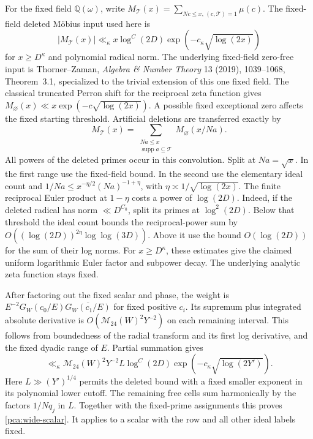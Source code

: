 For the fixed field \(\mathbb Q(\omega)\), write
\(M_{\mathcal T}(x)=\sum_{Nc\le x,\,(c,\mathcal T)=1}\mu(c)\).
The fixed-field deleted M\"obius input used here is
\[
 |M_{\mathcal T}(x)|\ll_\kappa
 x\log^C(2D)\exp(-c_\kappa\sqrt{\log(2x)})
\]
for \(x\ge D^\kappa\) and polynomial radical norm.
The underlying fixed-field zero-free input is
Thorner--Zaman, \emph{Algebra \& Number Theory} 13 (2019),
1039--1068, Theorem~3.1, specialized to the trivial
extension of this one fixed field.
The classical truncated Perron shift for the reciprocal
zeta function gives
\(M_{\varnothing}(x)\ll x\exp(-c\sqrt{\log(2x)})\).
A possible fixed exceptional zero affects the fixed
starting threshold.
Artificial deletions are transferred exactly by
\[
 M_{\mathcal T}(x)
   =\sum_{\substack{Na\le x\\
                   \operatorname{supp}a\subseteq\mathcal T}}
                              M_{\varnothing}(x/Na).
\]
All powers of the deleted primes occur in this convolution.
Split at \(Na=\sqrt x\). In the first range use the
fixed-field bound. In the second use the elementary ideal
count and \(1/Na\le x^{-\eta/2}(Na)^{-1+\eta}\), with
\(\eta\asymp1/\sqrt{\log(2x)}\).
The finite reciprocal Euler product at \(1-\eta\) costs
a power of \(\log(2D)\). Indeed, if the deleted radical has
norm \(\ll D^{C_0}\), split its primes at
\(\log^2(2D)\). Below that threshold the ideal count bounds
the reciprocal-power sum by
\(O((\log(2D))^{2\eta}\log\log(3D))\).
Above it use the bound \(O(\log(2D))\) for the sum of their
log norms. For \(x\ge D^\kappa\), these estimates give the
claimed uniform logarithmic Euler factor and subpower
decay. The underlying analytic zeta function stays fixed.

After factoring out the fixed scalar and phase, the weight
is \(E^{-2}G_W(c_0/E)\overline{G_W(c_1/E)}\) for fixed
positive \(c_i\). Its supremum plus integrated absolute
derivative is \(O(\mathcal M_{24}(W)^2Y^{-2})\) on each
remaining interval. This follows from boundedness of the
radial transform and its first log derivative, and the
fixed dyadic range of \(E\). Partial summation gives
\[
 \ll_\kappa \mathcal M_{24}(W)^2Y^{-2}L\log^C(2D)
                      \exp(-c_\kappa\sqrt{\log(2Y')}).
\]
Here \(L\gg(Y')^{1/4}\) permits the deleted bound with a
fixed smaller exponent in its polynomial lower cutoff.
The remaining free cells sum harmonically by the factors
\(1/Nq_j\) in \(L\). Together with the fixed-prime assignments
this proves \eqref{pca:wide-scalar}. It applies to a scalar
with the row and all other ideal labels fixed.

